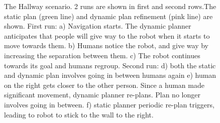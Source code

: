 \begin{figure}[p!]
{        }
    \caption{%
	The Hallway scenario. 2 runs are shown in first and second rows.The static plan (green line) and dynamic plan refinement (pink line) are shown. First run: a) Navigation starts. The dynamic planner anticipates that people will give way to the robot when it starts to move towards them. b) Humans notice the robot, and give way by increasing the separation between them. c) The robot continues towards its goal and humans regroup. Second run: d) both the static and dynamic plan involves going in between humans again e) human on the right gets closer to the other person. Since a human made significant movement, dynamic planner re-plans. Plan no longer involves going in between. f) static planner periodic re-plan triggers, leading to robot to stick to the wall to the right.
     }%
   \label{fig:corridor}
\end{figure}



